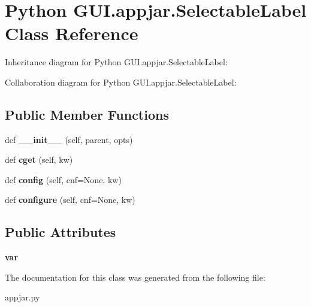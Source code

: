 \hypertarget{class_python_01_g_u_i_1_1appjar_1_1_selectable_label}{}\section{Python G\+U\+I.\+appjar.\+Selectable\+Label Class Reference}
\label{class_python_01_g_u_i_1_1appjar_1_1_selectable_label}


Inheritance diagram for Python G\+U\+I.\+appjar.\+Selectable\+Label\+:


Collaboration diagram for Python G\+U\+I.\+appjar.\+Selectable\+Label\+:
\subsection*{Public Member Functions}
\begin{DoxyCompactItemize}
\item 
\mbox{\label{class_python_01_g_u_i_1_1appjar_1_1_selectable_label_aba4db09fa9c32fa69f71940db32be278}} 
def {\bfseries \+\_\+\+\_\+init\+\_\+\+\_\+} (self, parent, opts)
\item 
\mbox{\label{class_python_01_g_u_i_1_1appjar_1_1_selectable_label_afee1d71bdcb0d302ce733819af29838c}} 
def {\bfseries cget} (self, kw)
\item 
\mbox{\label{class_python_01_g_u_i_1_1appjar_1_1_selectable_label_a635793cc59282d2ecdcc415937f6fc48}} 
def {\bfseries config} (self, cnf=None, kw)
\item 
\mbox{\label{class_python_01_g_u_i_1_1appjar_1_1_selectable_label_a012124acabbff33677f96b8d78a41412}} 
def {\bfseries configure} (self, cnf=None, kw)
\end{DoxyCompactItemize}
\subsection*{Public Attributes}
\begin{DoxyCompactItemize}
\item 
\mbox{\label{class_python_01_g_u_i_1_1appjar_1_1_selectable_label_aabb20674b9ec7472f60fd676a1deb378}} 
{\bfseries var}
\end{DoxyCompactItemize}


The documentation for this class was generated from the following file\+:\begin{DoxyCompactItemize}
\item 
appjar.\+py\end{DoxyCompactItemize}
